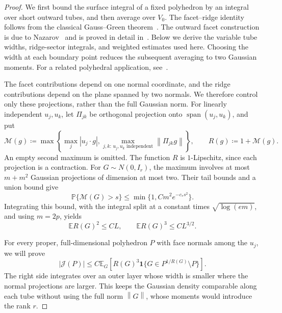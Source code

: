 \documentclass[11pt,letterpaper]{article}
\theoremstyle{remark}
\newcommand{\E}{\mathbb E}
\newcommand{\Pp}{\mathbb P}
\newcommand{\norm}[1]{\left\lVert#1\right\rVert}
\newcommand{\ind}{\mathbf 1}
\newcommand{\surf}{\mathcal J}
\begin{document}
\begin{proof}
We first bound the surface integral of a fixed polyhedron by an integral
over short outward tubes, and then average over \(V_0\). The
facet--ridge identity follows from the classical Gauss--Green
theorem~\cite[Chapter~5]{EvansGariepy2015}. The outward facet construction
is due to Nazarov~\cite{Nazarov2003} and is proved in detail
in~\cite[Lemmas~1--2]{CCK17N}. Below we derive the variable tube widths, ridge-sector
integrals, and weighted estimates used here. Choosing the width at each
boundary point reduces the subsequent averaging to two Gaussian moments.
For a related polyhedral application, see~\cite[Proposition~4]{GaoZhang}.

The facet contributions depend on one normal coordinate, and the ridge
contributions depend on the plane spanned by two normals. We therefore
control only these projections, rather than the full Gaussian norm. For linearly independent \(u_j,u_k\), let \(\Pi_{jk}\)
be orthogonal projection onto \(\operatorname{span}(u_j,u_k)\), and put
\begin{equation}
 \mathcal M(g)\coloneqq \max\left\{\max_j|u_j\cdot g|,
       \max_{j,k:\,u_j,u_k\text{ independent}}\norm{\Pi_{jk}g}\right\},
 \qquad R(g)\coloneqq 1+\mathcal M(g).
 \label{appx-an:projection-radius}
\end{equation}
An empty second maximum is omitted. The function \(R\) is
\(1\)-Lipschitz, since each projection is a contraction. For
\(G\sim N(0,I_r)\), the maximum involves at most \(m+m^2\)
Gaussian projections of dimension at most two. Their tail bounds and
a union bound give
\[
 \Pp\{\mathcal M(G)>s\}\le\min\{1,Cm^2e^{-c_*s^2}\}.
\]
Integrating this bound, with the integral split at a constant times
\(\sqrt{\log(em)}\), and using \(m=2p\), yields
\begin{equation}
 \E R(G)^2\le CL,\qquad \E R(G)^3\le CL^{3/2}.
 \label{appx-an:projection-moments}
\end{equation}

For every proper, full-dimensional polyhedron \(P\) with face normals among
the \(u_j\), we will prove
\begin{equation}
 |\surf(P)|\le C\E_G\left[R(G)^3
       \ind\{G\in P^{1/R(G)}\setminus P\}\right].
 \label{appx-an:adaptive-tubes}
\end{equation}
The right side integrates over an outer layer whose width is smaller
where the normal projections are larger. This keeps the Gaussian
density comparable along each tube without using the full norm
\(\norm G\), whose moments would introduce the rank \(r\).


\end{proof}
\end{document}
